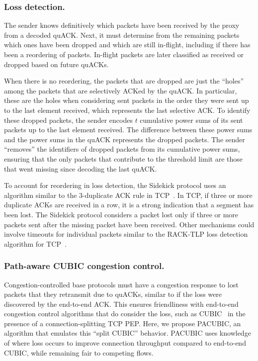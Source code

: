 \subsubsection{Loss detection.}

The sender knows definitively which packets have been received by the proxy from
a decoded quACK. Next, it must determine from the remaining packets which ones
have been dropped and which are still in-flight, including if there has been a
reordering of packets. In-flight packets are later classified as received or
dropped based on future quACKs.

When there is no reordering, the packets that are dropped are just the ``holes''
among the packets that are selectively ACKed by the quACK. In particular, these
are the holes when considering sent packets in the order they were sent up to
the last element received, which represents the last selective ACK. To identify
these dropped packets, the sender encodes $t$ cumulative power sums of its sent
packets up to the last element received. The difference between these power
sums and the power sums in the quACK represents the dropped packets. The sender
``removes'' the identifiers of dropped packets from its cumulative power sums,
ensuring that the only packets that contribute to the threshold limit are those
that went missing since decoding the last quACK.

To account for reordering in loss detection, the Sidekick protocol uses an
algorithm similar to the 3-duplicate ACK rule in
TCP~\cite{rfc5681tcp,rfc2001tcp}. In TCP, if three or more duplicate ACKs are
received in a row, it is a strong indication that a segment has been lost. The
Sidekick protocol considers a packet lost only if three or more packets sent
after the missing packet have been received. Other mechanisms could involve
timeouts for individual packets similar to the RACK-TLP loss detection
algorithm for TCP~\cite{rfc8985}.


\subsubsection{Path-aware CUBIC congestion control.}

Congestion-controlled base protocols must have a congestion response to lost
packets that they retransmit due to quACKs, similar to if the loss were
discovered by the end-to-end ACK.
This ensures friendliness with end-to-end congestion control algorithms that do
consider the loss, such as CUBIC~\cite{ha2008cubic} in the presence of a
connection-splitting TCP PEP.
Here, we propose PACUBIC, an algorithm that emulates this ``split CUBIC''
behavior. PACUBIC uses knowledge of where loss occurs to improve connection
throughput compared to end-to-end CUBIC, while remaining fair to competing flows.

